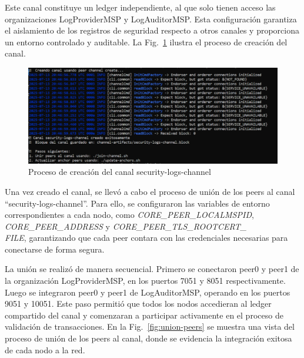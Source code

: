 Este canal constituye un ledger independiente, al que solo tienen acceso las organizaciones LogProviderMSP y LogAuditorMSP. Esta configuración garantiza el aislamiento de los registros de seguridad respecto a otros canales y proporciona un entorno controlado y auditable. La Fig.~\ref{fig:creacion-canal} ilustra el proceso de creación del canal.
\begin{figure}[H]
\centering
\includegraphics[width=1\textwidth]{figuras/creacion_canal.png}
\caption{Proceso de creación del canal security-logs-channel}
\label{fig:creacion-canal}
\end{figure}
Una vez creado el canal, se llevó a cabo el proceso de unión de los peers al canal “security-logs-channel”. Para ello, se configuraron las variables de entorno correspondientes a cada nodo, como \textit{CORE\_PEER\_LOCALMSPID}, \textit{CORE\_PEER\_ADDRESS} y \textit{CORE\_PEER\_TLS\_ROOTCERT\_\\FILE}, garantizando que cada peer contara con las credenciales necesarias para conectarse de forma segura.

La unión se realizó de manera secuencial. Primero se conectaron peer0 y peer1 de la organización LogProviderMSP, en los puertos 7051 y 8051 respectivamente. Luego se integraron peer0 y peer1 de LogAuditorMSP, operando en los puertos 9051 y 10051. Este paso permitió que todos los nodos accedieran al ledger compartido del canal y comenzaran a participar activamente en el proceso de validación de transacciones. En la Fig.~\ref{fig:union-peers} se muestra una vista del proceso de unión de los peers al canal, donde se evidencia la integración exitosa de cada nodo a la red.

